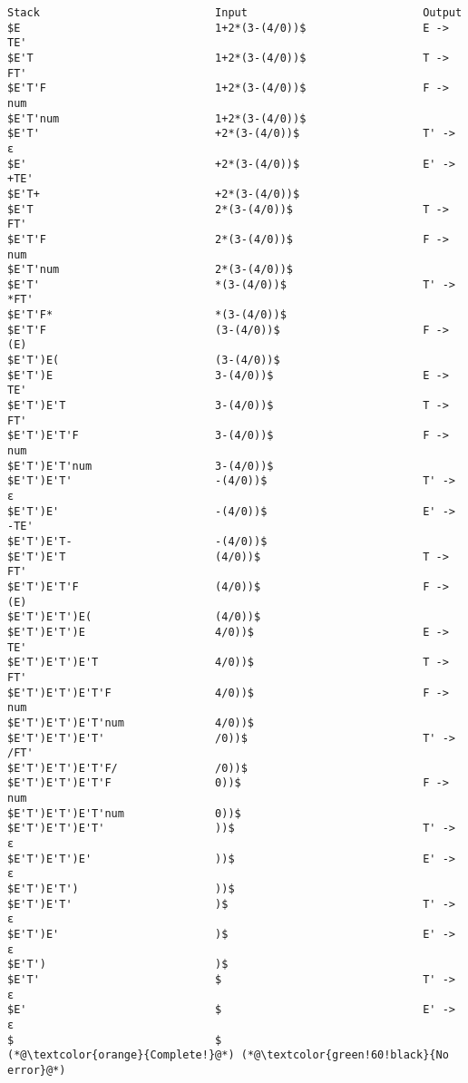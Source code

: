 \documentclass[lang=cn,11pt,a4paper]{elegantpaper}
\begin{document}
\begin{lstlisting}[language=text]
Stack                          	Input                          	Output
$E                             	1+2*(3-(4/0))$                	E -> TE'
$E'T                           	1+2*(3-(4/0))$                	T -> FT'
$E'T'F                         	1+2*(3-(4/0))$                	F -> num
$E'T'num                       	1+2*(3-(4/0))$                	
$E'T'                          	+2*(3-(4/0))$                 	T' -> ε
$E'                            	+2*(3-(4/0))$                 	E' -> +TE'
$E'T+                          	+2*(3-(4/0))$                 	
$E'T                           	2*(3-(4/0))$                  	T -> FT'
$E'T'F                         	2*(3-(4/0))$                  	F -> num
$E'T'num                       	2*(3-(4/0))$                  	
$E'T'                          	*(3-(4/0))$                   	T' -> *FT'
$E'T'F*                        	*(3-(4/0))$                   	
$E'T'F                         	(3-(4/0))$                    	F -> (E)
$E'T')E(                       	(3-(4/0))$                    	
$E'T')E                        	3-(4/0))$                     	E -> TE'
$E'T')E'T                      	3-(4/0))$                     	T -> FT'
$E'T')E'T'F                    	3-(4/0))$                     	F -> num
$E'T')E'T'num                  	3-(4/0))$                     	
$E'T')E'T'                     	-(4/0))$                      	T' -> ε
$E'T')E'                       	-(4/0))$                      	E' -> -TE'
$E'T')E'T-                     	-(4/0))$                      	
$E'T')E'T                      	(4/0))$                       	T -> FT'
$E'T')E'T'F                    	(4/0))$                       	F -> (E)
$E'T')E'T')E(                  	(4/0))$                       	
$E'T')E'T')E                   	4/0))$                        	E -> TE'
$E'T')E'T')E'T                 	4/0))$                        	T -> FT'
$E'T')E'T')E'T'F               	4/0))$                        	F -> num
$E'T')E'T')E'T'num             	4/0))$                        	
$E'T')E'T')E'T'                	/0))$                         	T' -> /FT'
$E'T')E'T')E'T'F/              	/0))$                         	
$E'T')E'T')E'T'F               	0))$                          	F -> num
$E'T')E'T')E'T'num             	0))$                          	
$E'T')E'T')E'T'                	))$                           	T' -> ε
$E'T')E'T')E'                  	))$                           	E' -> ε
$E'T')E'T')                    	))$                           	
$E'T')E'T'                     	)$                            	T' -> ε
$E'T')E'                       	)$                            	E' -> ε
$E'T')                         	)$                            	
$E'T'                          	$                             	T' -> ε
$E'                            	$                             	E' -> ε
$                              	$                             	
(*@\textcolor{orange}{Complete!}@*)	(*@\textcolor{green!60!black}{No error}@*)
\end{lstlisting}
\end{document}
